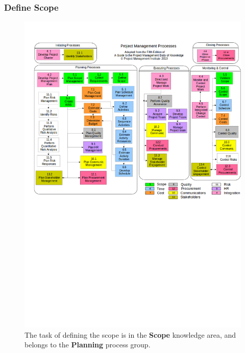 \documentclass[aspectratio=169]{beamer}
\begin{document}
\begin{frame}
\frametitle{Define Scope}
\vspace{-0.5cm}
\begin{figure}
\caption{The task of defining the scope is in the \textbf{Scope} knowledge area, and belongs to the \textbf{Planning} process group.}
\vspace{-0.8cm}
\includegraphics[scale=0.3]{mapping}
\end{figure}
\end{frame}

\end{document}
